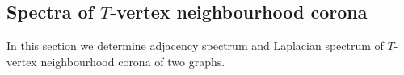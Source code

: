 \documentclass[a4paper,12pt]{article}
\begin{document}
\subsection{Spectra of $T$-vertex neighbourhood corona}
In this section we determine adjacency spectrum and Laplacian spectrum of $T$-vertex neighbourhood corona of two graphs.
\end{document}
